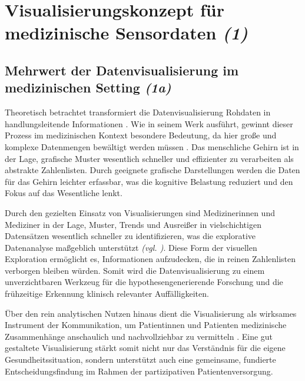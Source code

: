 

\section{Visualisierungskonzept für medizinische Sensordaten \textit{(1)}}


\subsection{Mehrwert der Datenvisualisierung im medizinischen Setting \textit{(1a)}}
\label{sec:1a}

Theoretisch betrachtet transformiert die Datenvisualisierung Rohdaten in handlungsleitende Informationen \cite[5]{2}. Wie \citeauthor{2} in seinem Werk ausführt, gewinnt dieser Prozess im medizinischen Kontext besondere Bedeutung, da hier große und komplexe Datenmengen bewältigt werden müssen \cite[5]{2}. Das menschliche Gehirn ist in der Lage, grafische Muster wesentlich schneller und effizienter zu verarbeiten als abstrakte Zahlenlisten. Durch geeignete grafische Darstellungen werden die Daten für das Gehirn leichter erfassbar, was die kognitive Belastung reduziert und den Fokus auf das Wesentliche lenkt.

Durch den gezielten Einsatz von Visualisierungen sind Medizinerinnen und Mediziner in der Lage, Muster, Trends und Ausreißer in vielschichtigen Datensätzen wesentlich schneller zu identifizieren, was die explorative Datenanalyse maßgeblich unterstützt \textit{(\acs{vgl.} \cite[7]{2})}. Diese Form der visuellen Exploration ermöglicht es, Informationen aufzudecken, die in reinen Zahlenlisten verborgen bleiben würden. Somit wird die Datenvisualisierung zu einem unverzichtbaren Werkzeug für die hypothesengenerierende Forschung und die frühzeitige Erkennung klinisch relevanter Auffälligkeiten.

Über den rein analytischen Nutzen hinaus dient die Visualisierung als wirksames Instrument der Kommunikation, um Patientinnen und Patienten medizinische Zusammenhänge anschaulich und nachvollziehbar zu vermitteln \cite[8]{2}. Eine gut gestaltete Visualisierung stärkt somit nicht nur das Verständnis für die eigene Gesundheitssituation, sondern unterstützt auch eine gemeinsame, fundierte Entscheidungsfindung im Rahmen der partizipativen Patientenversorgung.

